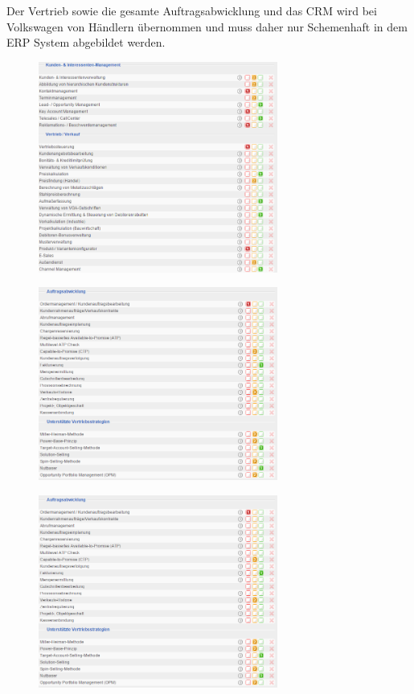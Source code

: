 \documentclass[12pt]{article}
\begin{document}
\noindent
Der Vertrieb sowie die gesamte Auftragsabwicklung und das CRM wird bei Volkswagen von Händlern übernommen und muss daher nur Schemenhaft in dem ERP System abgebildet werden.
\begin{figure}[!h]
\centering
\includegraphics[width=0.7\textwidth]{images/tr11}
\end{figure}\FloatBarrier
\noindent
\begin{figure}[!h]
\centering
\includegraphics[width=0.7\textwidth]{images/tr12}
\end{figure}\FloatBarrier
\noindent
\begin{figure}[!h]
\centering
\includegraphics[width=0.7\textwidth]{images/tr13}
\end{figure}\FloatBarrier
\end{document}
